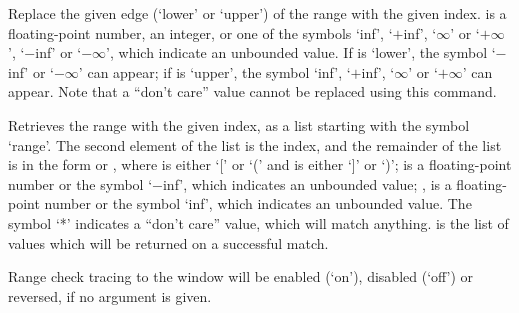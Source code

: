   Replace the given edge (`lower' or `upper') of the range with the given index.
   is a floating-point number, an integer, or one of the symbols `inf', `$+$inf',
  `$\infty$' or `$+\infty$', `$-$inf' or `$-\infty$', which indicate an unbounded value.
  If  is `lower', the symbol `$-$inf' or `$-\infty$' can appear;
  if  is `upper', the symbol `inf', `$+$inf', `$\infty$' or `$+\infty$' can appear.
  Note that a ``don't care'' value cannot be replaced using this command.

  Retrieves the range with the given index, as a list starting with the symbol `range'.
  The second element of the list is the index, and the remainder of the list is in the form
   or , where 
  is either `[' or `(' and  is either `]' or `)';
   is a floating-point number or the symbol `$-$inf',
  which indicates an unbounded value; , is a floating-point number or
  the symbol `inf', which indicates an unbounded value.
  The symbol `*' indicates a ``don't care'' value, which will match anything.
   is the list of values which will be returned on a successful match.

  Range check tracing to the \MaxName{} window will be enabled (`on'), disabled (`off') or reversed,
  if no argument is given.
  
  \objListCmdEnd

\objItemFile[]

